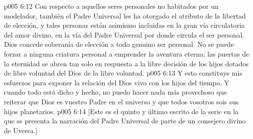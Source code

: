 \vs p005 6:12 \pc Con respecto a aquellos seres personales no habitados por un modelador, también el Padre Universal les ha otorgado el atributo de la libertad de elección, y tales personas están asimismo incluidas en la gran vía circulatoria del amor divino, en la vía del Padre Universal por donde circula el ser personal. Dios concede soberanía de elección a todo genuino ser personal. No se puede forzar a ninguna criatura personal a emprender la aventura eterna; las puertas de la eternidad se abren tan solo en respuesta a la libre decisión de los hijos dotados de libre voluntad del Dios de la libre voluntad.
\vs p005 6:13 \pc Y esto constituye mis esfuerzos para exponer la relación del Dios vivo con los hijos del tiempo. Y cuando todo está dicho y hecho, no puedo hacer nada más provechoso que reiterar que Dios es vuestro Padre en el universo y que todos vosotros sois sus hijos planetarios.
\vsetoff
\vs p005 6:14 [Este es el quinto y último escrito de la serie en la que se presenta la narración del Padre Universal de parte de un consejero divino de Uversa.]
